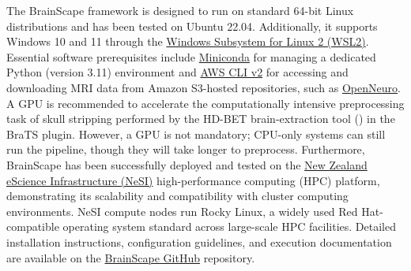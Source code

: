 The BrainScape framework is designed to run on standard 64-bit Linux distributions and has been tested on Ubuntu 22.04. 
Additionally, it supports Windows 10 and 11 through the \href{https://learn.microsoft.com/en-gb/windows/wsl}{Windows Subsystem for Linux 2 (WSL2)}.
Essential software prerequisites include \href{https://www.anaconda.com/docs/getting-started/miniconda/main}{Miniconda} for managing 
a dedicated Python (version 3.11) environment  
and \href{https://docs.aws.amazon.com/cli/latest/userguide/getting-started-install.html}{AWS CLI v2} for accessing and 
downloading MRI data from Amazon S3-hosted repositories, such as \href{https://openneuro.org/}{OpenNeuro}. 
A GPU is recommended to accelerate the computationally intensive preprocessing task of skull stripping 
performed by the HD-BET brain-extraction tool (\cite{isensee2019automated}) in the BraTS plugin. 
However, a GPU is not mandatory; CPU-only systems can still run the pipeline, though they will take longer to preprocess.
Furthermore, BrainScape has been successfully deployed and tested on the 
\href{https://www.nesi.org.nz/}{New Zealand eScience Infrastructure (NeSI)} 
high-performance computing (HPC) platform, demonstrating its scalability and compatibility with cluster computing environments. 
NeSI compute nodes run Rocky Linux, a widely used Red Hat-compatible operating system standard across large-scale HPC facilities. 
Detailed installation instructions, configuration guidelines, and execution documentation are available on
the \href{https://github.com/yasinzaii/BrainScape}{BrainScape GitHub} repository.

